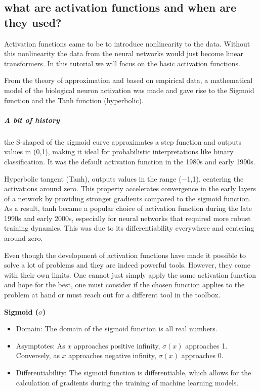 \documentclass[12pt, a4paper]{article}
\begin{document}
\subsection{what are activation functions and when are they used?}

\text Activation functions came to be to introduce nonlinearity to the data. Without this nonlinearity the data from the neural networks would just become linear transformers. In this tutorial we will focus on the basic activation functions. 

From the theory of approximation and based on empirical data, a mathematical model of the biological neuron activation was made and gave rise to the Sigmoid function and the Tanh function (hyperbolic).  

\subparagraph{ A bit of history }
the S-shaped of the sigmoid curve approximates a step function and outputs values in (0,1), making it ideal for probabilistic interpretations like binary classification. It was the default activation function in the 1980s and early 1990s. \citep{lecun1998}

Hyperbolic tangent (Tanh), outputs values in the range (−1,1), centering the activations around zero. This property accelerates convergence in the early layers of a network by providing stronger gradients compared to the sigmoid function. As a result, tanh became a popular choice of activation function during the late 1990s and early 2000s, especially for neural networks that required more robust training dynamics. This was due to its differentiability everywhere and centering around zero.


Even though the development of activation functions have made it possible to solve a lot of problems and they are indeed powerful tools. However, they come with their own limits. 
One cannot just simply apply the same activation function and hope for the best, one must consider if the chosen function applies to the problem at hand or must reach out for a different tool in the toolbox. 

\textbf{Sigmoid ($\sigma$) }
\begin{itemize}
    \item Domain: The domain of the sigmoid function is all real numbers.
    \item Asymptotes: As $x$ approaches positive infinity, $\sigma(x)$ approaches 1. Conversely, as $x$ approaches negative infinity, $\sigma(x)$ approaches 0. 
    \item Differentiability: The sigmoid function is differentiable, which allows for the calculation of gradients during the training of machine learning models.
\end{itemize}
\end{document}
